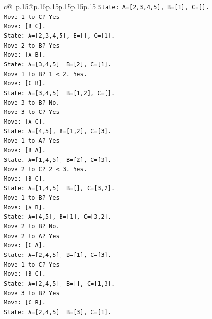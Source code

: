 \documentclass{article}
\begin{document}
{\begin{supertabular}{c@{$\;$}|p{.15\linewidth}@{}p{.15\linewidth}p{.15\linewidth}p{.15\linewidth}p{.15\linewidth}p{.15\linewidth}}
{{{\texttt{State: A={[}2,3,4,5{]}, B={[}1{]}, C={[}{]}.} \\
\texttt{Move 1 to C? Yes.} \\
\texttt{Move: {[}B C{]}.} \\
\texttt{State: A={[}2,3,4,5{]}, B={[}{]}, C={[}1{]}.} \\
\texttt{Move 2 to B? Yes.} \\
\texttt{Move: {[}A B{]}.} \\
\texttt{State: A={[}3,4,5{]}, B={[}2{]}, C={[}1{]}.} \\
\texttt{Move 1 to B? 1 < 2. Yes.} \\
\texttt{Move: {[}C B{]}.} \\
\texttt{State: A={[}3,4,5{]}, B={[}1,2{]}, C={[}{]}.} \\
\texttt{Move 3 to B? No.} \\
\texttt{Move 3 to C? Yes.} \\
\texttt{Move: {[}A C{]}.} \\
\texttt{State: A={[}4,5{]}, B={[}1,2{]}, C={[}3{]}.} \\
\texttt{Move 1 to A? Yes.} \\
\texttt{Move: {[}B A{]}.} \\
\texttt{State: A={[}1,4,5{]}, B={[}2{]}, C={[}3{]}.} \\
\texttt{Move 2 to C? 2 < 3. Yes.} \\
\texttt{Move: {[}B C{]}.} \\
\texttt{State: A={[}1,4,5{]}, B={[}{]}, C={[}3,2{]}.} \\
\texttt{Move 1 to B? Yes.} \\
\texttt{Move: {[}A B{]}.} \\
\texttt{State: A={[}4,5{]}, B={[}1{]}, C={[}3,2{]}.} \\
\texttt{Move 2 to B? No.} \\
\texttt{Move 2 to A? Yes.} \\
\texttt{Move: {[}C A{]}.} \\
\texttt{State: A={[}2,4,5{]}, B={[}1{]}, C={[}3{]}.} \\
\texttt{Move 1 to C? Yes.} \\
\texttt{Move: {[}B C{]}.} \\
\texttt{State: A={[}2,4,5{]}, B={[}{]}, C={[}1,3{]}.} \\
\texttt{Move 3 to B? Yes.} \\
\texttt{Move: {[}C B{]}.} \\
\texttt{State: A={[}2,4,5{]}, B={[}3{]}, C={[}1{]}.} \\
}}}
\end{supertabular}}
\end{document}
